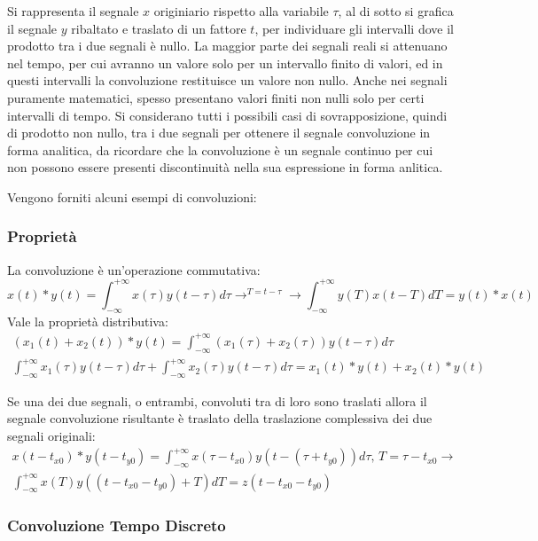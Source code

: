 \documentclass{article}
\numberwithin{equation}{subsection}
\begin{document}
Si rappresenta il segnale $x$ originiario rispetto alla variabile $\tau$, al di sotto si grafica il segnale $y$ ribaltato e traslato di un fattore $t$, per individuare gli 
intervalli dove il prodotto tra i due segnali è nullo. La maggior parte dei segnali reali si attenuano nel tempo, per cui avranno un valore solo per un intervallo finito 
di valori, ed in questi intervalli la convoluzione restituisce un valore non nullo. Anche nei segnali puramente matematici, spesso presentano valori finiti non nulli solo per 
certi intervalli di tempo. Si considerano tutti i possibili casi di sovrapposizione, quindi di prodotto non nullo, tra i due segnali per ottenere 
il segnale convoluzione in forma analitica, da ricordare che la convoluzione è un segnale continuo per cui non possono essere presenti discontinuità nella sua espressione 
in forma anlitica. 



Vengono forniti alcuni esempi di convoluzioni:

\subsubsection{Proprietà}

La convoluzione è un'operazione commutativa:
\begin{equation*}
    x(t)*y(t)=\displaystyle\int_{-\infty}^{+\infty}x(\tau)y(t-\tau)d\tau \to^{T=t-\tau}\to \int_{-\infty}^{+\infty}y(T)x(t-T)dT=y(t)*x(t)
\end{equation*}
Vale la proprietà distributiva:
\begin{gather*}
    (x_1(t)+x_2(t))*y(t)=\displaystyle\int_{-\infty}^{+\infty}(x_1(\tau)+x_2(\tau))y(t-\tau)d\tau\\
    \int_{-\infty}^{+\infty}x_1(\tau)y(t-\tau)d\tau+\int_{-\infty}^{+\infty}x_2(\tau)y(t-\tau)d\tau=x_1(t)*y(t)+x_2(t)*y(t)
\end{gather*}

Se una dei due segnali, o entrambi, convoluti tra di loro sono traslati allora il segnale convoluzione risultante è traslato della traslazione complessiva dei due segnali originali:
\begin{gather*}
    x(t-t_{x0})*y(t-t_{y0})=\displaystyle\int_{-\infty}^{+\infty}x(\tau-t_{x0})y(t-(\tau+t_{y0}))d\tau,\,{T=\tau-t_{x0}}\to\\
    \int_{-\infty}^{+\infty}x(T)y((t-t_{x0}-t_{y0})+T)dT=z(t-t_{x0}-t_{y0})
\end{gather*}

\subsubsection{Convoluzione Tempo Discreto}
\end{document}
